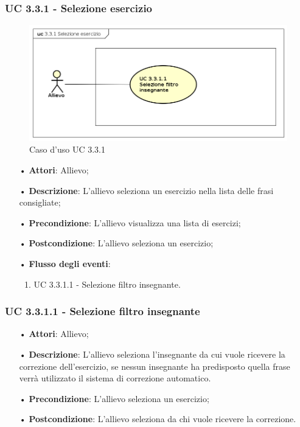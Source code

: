\subsubsection{UC 3.3.1 - Selezione esercizio}
\begin{figure}
\centering
\includegraphics[width=17cm]{img/UC331.png} 
\caption{Caso d'uso UC 3.3.1}\label{fig:331}
\end{figure}

\begin{itemize}
\item[•]\textbf{Attori}: Allievo;
\item[•]\textbf{Descrizione}: L'allievo seleziona un esercizio nella lista delle frasi consigliate;
\item[•]\textbf{Precondizione}: L'allievo visualizza una lista di esercizi;
\item[•]\textbf{Postcondizione}: L'allievo seleziona un esercizio;
\item[•]\textbf{Flusso degli eventi}:
\begin{enumerate}
\item UC 3.3.1.1 - Selezione filtro insegnante.
\end{enumerate}
\end{itemize}

\subsubsection{UC 3.3.1.1 - Selezione filtro insegnante}

\begin{itemize}
\item[•]\textbf{Attori}: Allievo;
\item[•]\textbf{Descrizione}: L'allievo seleziona l'insegnante da cui vuole ricevere la correzione dell'esercizio, se nessun insegnante ha predisposto quella frase verrà utilizzato il sistema di correzione automatico. %
\item[•]\textbf{Precondizione}: L'allievo seleziona un esercizio;
\item[•]\textbf{Postcondizione}: L'allievo seleziona da chi vuole ricevere la correzione.
\end{itemize}

